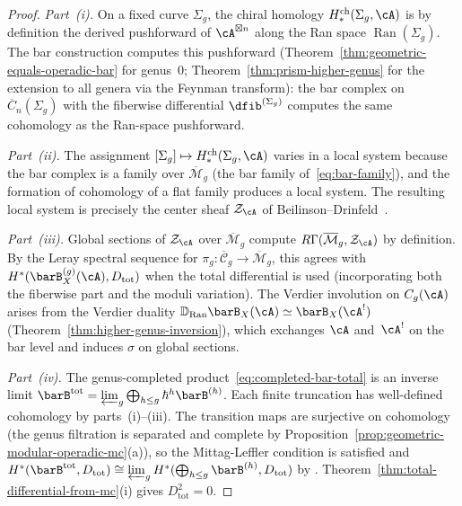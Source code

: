 \begin{proof}
\emph{Part~(i).}
On a fixed curve $\Sigma_g$, the chiral homology
$H^{\mathrm{ch}}_*(\Sigma_g, \cA)$ is by definition
\cite[3.4.4]{BD04} the derived pushforward of $\cA^{\boxtimes n}$
along the Ran space $\operatorname{Ran}(\Sigma_g)$.  The bar
construction computes this pushforward
(Theorem~\ref{thm:geometric-equals-operadic-bar} for genus~$0$;
Theorem~\ref{thm:prism-higher-genus} for the extension to all
genera via the Feynman transform): the bar complex on
$\overline{C}_n(\Sigma_g)$ with the fiberwise differential
$\dfib^{(\Sigma_g)}$ computes the same cohomology as the Ran-space
pushforward.

\emph{Part~(ii).}
The assignment $[\Sigma_g] \mapsto
H^{\mathrm{ch}}_*(\Sigma_g, \cA)$ varies in a local system because
the bar complex is a family over $\overline{\mathcal{M}}_g$
(the bar family of~\eqref{eq:bar-family}), and the formation of
cohomology of a flat family produces a local system.  The resulting
local system is precisely the center sheaf $\mathcal{Z}_\cA$ of
Beilinson--Drinfeld~\cite[3.4.10]{BD04}.

\emph{Part~(iii).}
Global sections of $\mathcal{Z}_\cA$ over
$\overline{\mathcal{M}}_g$ compute
$R\Gamma(\overline{\mathcal{M}}_g, \mathcal{Z}_\cA)$
by definition.
By the Leray spectral sequence for
$\pi_g\colon \overline{\mathcal{C}}_g \to \overline{\mathcal{M}}_g$,
this agrees with
$H^*(\barB^{(g)}_X(\cA), D_{\mathrm{tot}})$ when the total
differential is used (incorporating both the fiberwise part and
the moduli variation).  The Verdier involution on $C_g(\cA)$
arises from the Verdier duality
$\mathbb{D}_{\operatorname{Ran}} \barB_X(\cA) \simeq
\barB_X(\cA^!)$
(Theorem~\ref{thm:higher-genus-inversion}), which exchanges
$\cA$ and~$\cA^!$ on the bar level and induces $\sigma$ on
global sections.

\emph{Part~(iv).}
The genus-completed product~\eqref{eq:completed-bar-total} is
an inverse limit $\barB^{\mathrm{tot}} = \varprojlim_g
\bigoplus_{h \leq g} \hbar^h \barB^{(h)}$.  Each finite
truncation has well-defined cohomology by parts~(i)--(iii).
The transition maps are surjective on cohomology (the genus
filtration is separated and complete by
Proposition~\ref{prop:geometric-modular-operadic-mc}(a)),
so the Mittag-Leffler condition is satisfied and
$H^*(\barB^{\mathrm{tot}}, D_{\mathrm{tot}})
\cong \varprojlim_g H^*(\bigoplus_{h \leq g}
\barB^{(h)}, D_{\mathrm{tot}})$
by \cite[Proposition~3.5.7]{Weibel94}.
Theorem~\ref{thm:total-differential-from-mc}(i) gives
$D_{\mathrm{tot}}^2 = 0$.
\end{proof}

